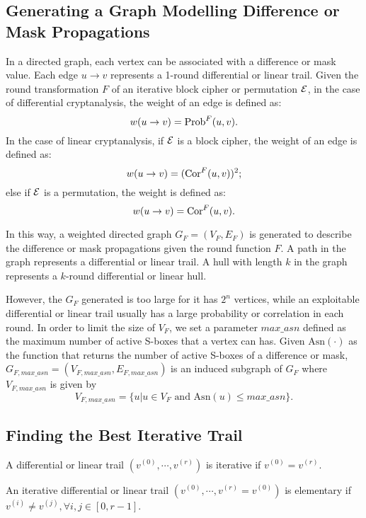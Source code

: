 \subsection{Generating a Graph Modelling Difference or Mask Propagations}

In a directed graph, each vertex can be associated with a difference or mask value. Each edge $u\rightarrow v$ represents a 1-round differential or linear trail. Given the round transformation $F$ of an iterative block cipher or permutation $\mathcal{E}$, in the case of differential cryptanalysis, the weight of an edge is defined as:
\[
    w(u\rightarrow v)=\text{Prob}^{F}(u,v).
\]
In the case of linear cryptanalysis, if $\mathcal{E}$ is a block cipher, the weight of an edge is defined as:
\[
    w(u\rightarrow v)=(\text{Cor}^{F}(u,v))^2;
\]
else if $\mathcal{E}$ is a permutation, the weight is defined as:
\[
    w(u\rightarrow v)=\text{Cor}^{F}(u,v).
\]

In this way, a weighted directed graph $G_{F}=(V_{F},E_{F})$ is generated to describe the difference or mask propagations given the round function $F$. A path in the graph represents a differential or linear trail. A hull with length $k$ in the graph represents a $k$-round differential or linear hull. 

However, the $G_F$ generated is too large for it has $2^n$ vertices, while an exploitable differential or linear trail usually has a large probability or correlation in each round. In order to limit the size of $V_F$, we set a parameter $max\_asn$ defined as the maximum number of active S-boxes that a vertex can has. Given $\text{Asn}(\cdot)$ as the function that returns the number of active S-boxes of a difference or mask, $G_{F,max\_asn}=(V_{F,max\_asn},E_{F,max\_asn})$ is an induced subgraph of $G_F$ where $V_{F,max\_asn}$ is given by
\[
    V_{F,max\_asn}=\{u|u\in V_F \text{ and } \text{Asn}(u)\leq max\_asn\}.
\]

\subsection{Finding the Best Iterative Trail}\label{sec:fbit}

\begin{definition}\label{def:it}
	A differential or linear trail $(v^{(0)},\cdots,v^{(r)})$ is iterative if $v^{(0)}=v^{(r)}$.
\end{definition}

\begin{definition}
    An iterative differential or linear trail $(v^{(0)},\cdots,v^{(r)}=v^{(0)})$ is elementary if $v^{(i)}\neq v^{(j)},\forall i,j\in [0,r-1]$.
\end{definition}

